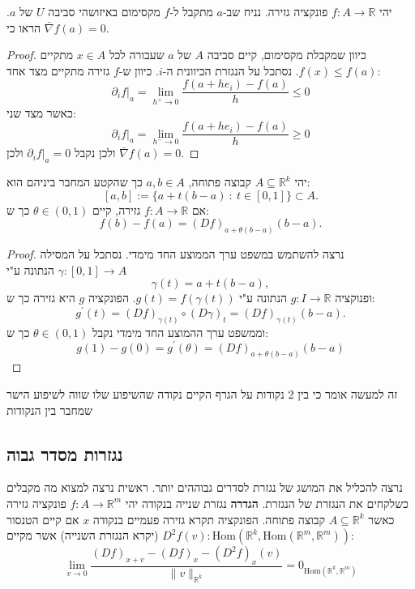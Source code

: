 \documentclass{tstextbook}
\begin{document}
\begin{proposition}
יהי \(f:A\to\mathbb{R}\) פונקציה גזירה. נניח שב-\(a\) מתקבל ל-\(f\) מקסימום באיזושהי סביבה \(U\) של \(a\). הראו כי \(\bar{\nabla}f(a)=0\).

\end{proposition}
\begin{proof}
כיוון שמקבלת מקסימום, קיים סביבה \(A\) של \(a\) שעבורה לכל \(x \in A\) מתקיים \(f(x)\leq f(a)\). נסתכל על הנגזרת הכיוונית ה-\(i\). כיוון ש-\(f\) גזירה מתקיים מצד אחד:
$$\partial_{i} f|_{a}=\lim_{ h^+ \to 0 } \frac{f(a+he_{i})-f(a)}{h}\leq 0$$
כאשר מצד שני:
$$\partial_{i} f|_{a}=\lim_{ h^- \to 0 } \frac{f(a+he_{i})-f(a)}{h}\geq 0$$
ולכן נקבל \(\partial_{i}f|_{a}=0\) ולכן \(\bar{\nabla}f(a)=0\).

\end{proof}
\begin{theorem}
יהי \(A\subseteq \mathbb{R}^k\) קבוצה פתוחה, \(a,b\in A\) כך שהקטע המחבר ביניהם הוא:
$$[a,b]:=\{a+t(b-a)\::\:t\in[0,1]\}\subset A.$$
אם \(f:A\to\mathbb{R}\) גזירה, קיים \(\theta \in(0,1)\) כך ש:
$$f(b)-f(a)=(D f)_{a+\theta(b-a)}(b-a).$$

\end{theorem}
\begin{proof}
נרצה להשתמש במשפט ערך הממוצע החד מימדי. נסתכל על המסילה \(\gamma:[0,1]\to A\) הנתונה ע"י $$\gamma(t)=a+t(b-a),$$ ופנוקציה \(g:I\to\mathbb{R}\) הנתונה ע"י \(g(t)=f\left( \gamma(t) \right)\). הפונקציה \(g\) היא גזירה כך ש:
$$g^{\prime}(t)=(D f)_{\gamma(t)}\circ(D\gamma)_{t}=(D f)_{\gamma(t)}(b-a).$$
וממשפט ערך ההמוצע החד מימדי נקבל \(\theta \in(0,1)\) כך ש:
$$g(1)-g(0)=g^{\prime}(\theta)=(D f)_{a+\theta(b-a)}(b-a)$$

\end{proof}
זה למעשה אומר כי בין 2 נקודות על הגרף הקיים נקודה שהשיפוע שלו שווה לשיפוע הישר שמחבר בין הנקודות

\subsection{נגזרות מסדר גבוה}

נרצה להכליל את המושג של נגזרת לסדרים גבוההים יותר. ראשית נרצה למצוא מה מקבלים כשלקחים את הנגזרת של הנגזרת.
\textbf{הגדרה} נגזרת שנייה בנקודה
יהי \(f:A\to\mathbb{R}^m\) פונקציה גזירה כאשר \(A\subseteq \mathbb{R}^k\) קבוצה פתוחה. הפונקציה תקרא גזירה פעמיים בנקודה \(x\) אם קיים הטנסור \(D^2f(v):\mathrm{Hom}\left( \mathbb{R}^k,\mathrm{Hom}\left( \mathbb{R}^m,\mathbb{R}^m \right) \right)\) (יקרא הנגזרת השנייה) אשר מקיים:
$$ \lim\limits_{ v \to0}\frac{(Df)_{x+ v }-(Df)_x-(D^2f)_x\left(  v  \right)}{\| v \|_{\mathbb{R}^k}}=0_{\mathrm{Hom}\left( \mathbb{R}^k,\mathbb{R}^m \right)}$$
\end{document}
